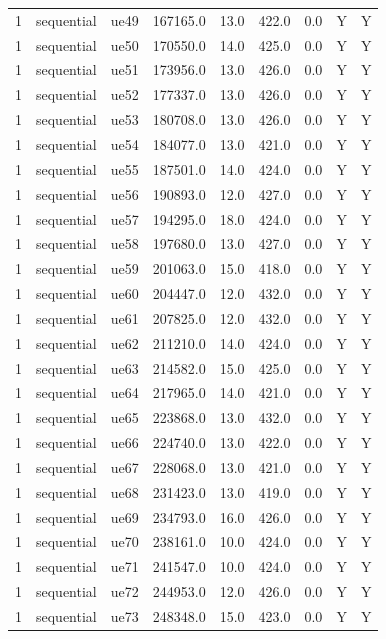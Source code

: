 \begin{table}[ht]
\begin{tabular}{|c|c|c|c|c|c|c|c|c|}
1 & sequential & ue49 & 167165.0 & 13.0 & 422.0 & 0.0 & Y & Y \\
1 & sequential & ue50 & 170550.0 & 14.0 & 425.0 & 0.0 & Y & Y \\
1 & sequential & ue51 & 173956.0 & 13.0 & 426.0 & 0.0 & Y & Y \\
1 & sequential & ue52 & 177337.0 & 13.0 & 426.0 & 0.0 & Y & Y \\
1 & sequential & ue53 & 180708.0 & 13.0 & 426.0 & 0.0 & Y & Y \\
1 & sequential & ue54 & 184077.0 & 13.0 & 421.0 & 0.0 & Y & Y \\
1 & sequential & ue55 & 187501.0 & 14.0 & 424.0 & 0.0 & Y & Y \\
1 & sequential & ue56 & 190893.0 & 12.0 & 427.0 & 0.0 & Y & Y \\
1 & sequential & ue57 & 194295.0 & 18.0 & 424.0 & 0.0 & Y & Y \\
1 & sequential & ue58 & 197680.0 & 13.0 & 427.0 & 0.0 & Y & Y \\
1 & sequential & ue59 & 201063.0 & 15.0 & 418.0 & 0.0 & Y & Y \\
1 & sequential & ue60 & 204447.0 & 12.0 & 432.0 & 0.0 & Y & Y \\
1 & sequential & ue61 & 207825.0 & 12.0 & 432.0 & 0.0 & Y & Y \\
1 & sequential & ue62 & 211210.0 & 14.0 & 424.0 & 0.0 & Y & Y \\
1 & sequential & ue63 & 214582.0 & 15.0 & 425.0 & 0.0 & Y & Y \\
1 & sequential & ue64 & 217965.0 & 14.0 & 421.0 & 0.0 & Y & Y \\
1 & sequential & ue65 & 223868.0 & 13.0 & 432.0 & 0.0 & Y & Y \\
1 & sequential & ue66 & 224740.0 & 13.0 & 422.0 & 0.0 & Y & Y \\
1 & sequential & ue67 & 228068.0 & 13.0 & 421.0 & 0.0 & Y & Y \\
1 & sequential & ue68 & 231423.0 & 13.0 & 419.0 & 0.0 & Y & Y \\
1 & sequential & ue69 & 234793.0 & 16.0 & 426.0 & 0.0 & Y & Y \\
1 & sequential & ue70 & 238161.0 & 10.0 & 424.0 & 0.0 & Y & Y \\
1 & sequential & ue71 & 241547.0 & 10.0 & 424.0 & 0.0 & Y & Y \\
1 & sequential & ue72 & 244953.0 & 12.0 & 426.0 & 0.0 & Y & Y \\
1 & sequential & ue73 & 248348.0 & 15.0 & 423.0 & 0.0 & Y & Y \\

\end{tabular}
\end{table}
